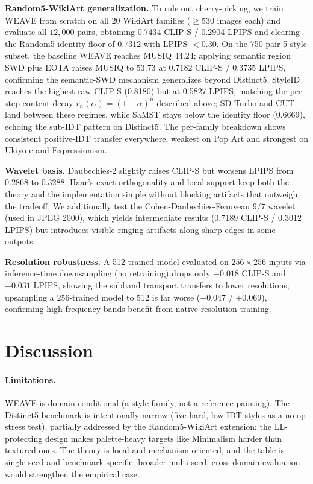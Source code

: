 \documentclass[letterpaper]{article}
\begin{document}
\textbf{Random5-WikiArt generalization.}
To rule out cherry-picking, we train WEAVE from scratch on all 20 WikiArt families ($\ge$530 images each) and evaluate all $12{,}000$ pairs, obtaining 0.7434 CLIP-S / 0.2904 LPIPS and clearing the Random5 identity floor of 0.7312 with LPIPS $<0.30$.
On the 750-pair 5-style subset, the baseline WEAVE reaches MUSIQ $44.24$; applying semantic region SWD plus EOTA raises MUSIQ to $53.73$ at $0.7182$ CLIP-S / $0.3735$ LPIPS, confirming the semantic-SWD mechanism generalizes beyond Distinct5.
StyleID reaches the highest raw CLIP-S (0.8180) but at 0.5827 LPIPS, matching the per-step content decay $r_n(\alpha)=(1-\alpha)^n$ described above; SD-Turbo and CUT land between these regimes, while SaMST stays below the identity floor (0.6669), echoing the sub-IDT pattern on Distinct5.
The per-family breakdown shows consistent positive-IDT transfer everywhere, weakest on Pop Art and strongest on Ukiyo-e and Expressionism.

\textbf{Wavelet basis.}
Daubechies-2 slightly raises CLIP-S but worsens LPIPS from 0.2868 to 0.3288.
Haar's exact orthogonality and local support keep both the theory and the implementation simple without blocking artifacts that outweigh the tradeoff.
We additionally test the Cohen-Daubechies-Feauveau 9/7 wavelet (used in JPEG 2000), which yields intermediate results (0.7189 CLIP-S / 0.3012 LPIPS) but introduces visible ringing artifacts along sharp edges in some outputs.

\textbf{Resolution robustness.}
A 512-trained model evaluated on $256{\times}256$ inputs via inference-time downsampling (no retraining) drops only $-0.018$ CLIP-S and $+0.031$ LPIPS, showing the subband transport transfers to lower resolutions; upsampling a 256-trained model to 512 is far worse ($-0.047$ / $+0.069$), confirming high-frequency bands benefit from native-resolution training.


\section{Discussion}

\paragraph{Limitations.}
WEAVE is domain-conditional (a style family, not a reference painting).
The Distinct5 benchmark is intentionally narrow (five hard, low-IDT styles as a no-op stress test), partially addressed by the Random5-WikiArt extension; the LL-protecting design makes palette-heavy targets like Minimalism harder than textured ones.
The theory is local and mechanism-oriented, and the table is single-seed and benchmark-specific; broader multi-seed, cross-domain evaluation would strengthen the empirical case.
\end{document}
